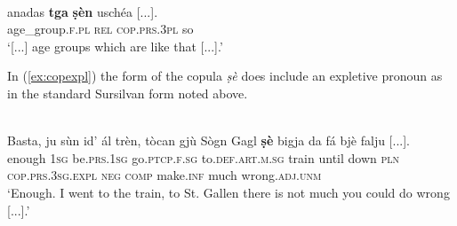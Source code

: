 \ea
\label{}
\\
\gll [...] anadas \textbf{tga} \textbf{ṣèn} uschéa [...].\\
{} age\_group.\textsc{f.pl} \textsc{rel} \textsc{cop.prs.3pl} so\\
\glt `[...] age groups which are like that [...].'
\z

In (\ref{ex:copexpl}) the form of the copula \textit{ṣè} does include an expletive pronoun as in the standard Sursilvan form noted above. 

\ea
\label{ex:copexpl}
\\
	\gll Basta, ju sùn id’ ál trèn, tòcan gjù Sògn Gagl \textbf{ṣè} bigja da fá bjè falju [...].   \\
enough \textsc{1sg} be.\textsc{prs.1sg} go.\textsc{ptcp.f.sg} to.\textsc{def.art.m.sg} train until down \textsc{pln} {} \textsc{cop.prs.3sg.expl} \textsc{neg} \textsc{comp} make.\textsc{inf} much wrong.\textsc{adj.unm}\\
\glt `Enough. I went to the train, to St. Gallen there is not much you could do wrong [...].'
\z

